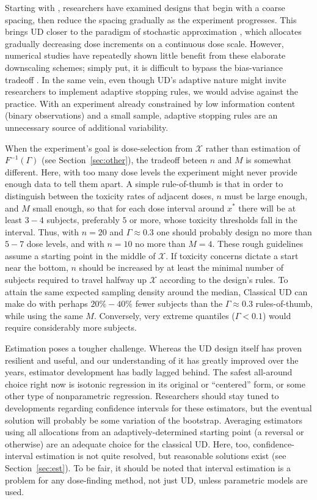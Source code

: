 Starting with \citep{Weth:Sequ:1963}, researchers have examined designs that begin with a coarse spacing, then reduce the spacing gradually as the experiment progresses. This brings UD closer to the paradigm of stochastic approximation \citep{Robb:Monro:Asto:1951}, which allocates gradually decreasing dose increments on a continuous dose scale. However, numerical studies have repeatedly shown little benefit from these elaborate downscaling schemes; simply put, it is difficult to bypass the bias-variance tradeoff \citep{Garc:Pere:Forc:1998}. In the same vein, even though UD's adaptive nature might invite researchers to implement adaptive stopping rules, we would advise against the practice. With an experiment already constrained by low information content (binary observations) and a small sample, adaptive stopping rules are an unnecessary source of additional variability.

When the experiment's goal is dose-selection from $\mathcal{X}$ rather than estimation of $F^{-1}(\Gamma)$ (see Section~\ref{sec:other}), the tradeoff beteen $n$ and $M$ is somewhat different. Here, with too many dose levels the experiment might never provide enough data to tell them apart. A simple rule-of-thumb is that in order to distinguish between the toxicity rates of adjacent doses, $n$ must be large enough, and $M$ small enough, so that for each dose interval around $x^*$ there will be at least $3-4$ subjects, preferably $5$ or more, whose toxicity thresholds fall in the interval.  Thus, with $n=20$ and $\Gamma\approx 0.3$ one should probably design no more than $5-7$ dose levels, and with $n=10$ no more than $M=4$. These rough guidelines assume a starting point in the middle of $\mathcal{X}$. If toxicity concerns dictate a start near the bottom, $n$ should be increased by at least the minimal number of subjects required to travel halfway up $\mathcal{X}$ according to the design's rules. To attain the same expected sampling density around the median, Classical UD can make do with perhaps $20\%-40\%$ fewer subjects than the $\Gamma\approx 0.3$ rules-of-thumb, while using the same $M$. Conversely, very extreme quantiles ($\Gamma<0.1$) would require considerably more subjects.

Estimation poses a tougher challenge. Whereas the UD design itself has proven resilient and useful, and our understanding of it has greatly improved over the years, estimator development has badly lagged behind. The safest all-around choice right now is isotonic regression in its original or ``centered'' form, or some other type of nonparametric regression. Researchers should stay tuned to developments regarding confidence intervals for these estimators, but the eventual solution will probably be some variation of the bootstrap. Averaging estimators using all allocations from an adaptively-determined starting point (a reversal or otherwise) are an adequate choice for the classical UD. Here, too, confidence-interval estimation is not quite resolved, but reasonable solutions exist (see Section~\ref{sec:est}). To be fair, it should be noted that interval estimation is a problem for any dose-finding method, not just UD, unless parametric models are used.

